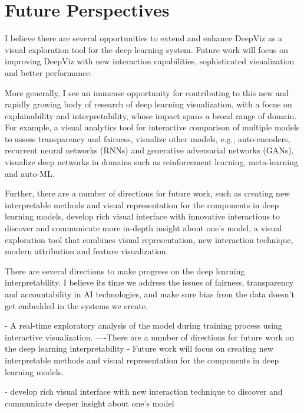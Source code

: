 \chapter{Future Perspectives}
\thispagestyle{empty}

I believe there are several opportunities to extend and enhance DeepViz as a visual exploration tool for the deep learning system. Future work will focus on improving DeepViz with new interaction capabilities, sophisticated visualization and better performance.

More generally, I see an immense opportunity for contributing to this new and rapidly growing body of research of deep learning visualization, with a focus on explainability and interpretability, whose impact spans a broad range of domain. For example, a visual analytics tool for interactive comparison of multiple models to assess transparency and fairness, visualize other models, e.g., auto-encoders, recurrent neural networks (RNNs) and generative adversarial networks (GANs), visualize deep networks in domains such as reinforcement learning, meta-learning and auto-ML.

Further, there are a number of directions for future work, such as creating new interpretable methods and visual representation for the components in deep learning models, develop rich visual interface with innovative interactions to discover and communicate more in-depth insight about one's model, a visual exploration tool that combines visual representation, new interaction technique, modern attribution and feature visualization.

There are several directions to make progress on the deep learning interpretability. I believe its time we address the issues of fairness, transparency and accountability in AI technologies, and make sure bias from the data doesn't get embedded in the systems we create.


\iffalse %

- A real-time exploratory analysis of the model during training process using interactive visualization. 
----There are a number of directions for future work on the deep learning interpretability
- Future work will focus on creating new interpretable methods and visual representation for the components in deep learning models.

- develop rich visual interface with new interaction technique to discover and communicate deeper insight about one's model

